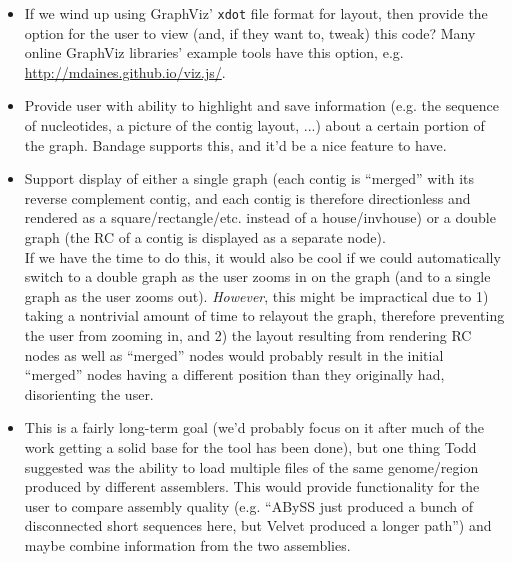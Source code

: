 \documentclass[12pt]{article}
\begin{document}
\begin{itemize}
	\begin{itemize}
	\item If we wind up using GraphViz' \texttt{xdot} file format for
		layout, then provide the option for the user to view (and,
		if they want to, tweak) this code? Many online GraphViz
		libraries' example tools have this option, e.g.
		\url{http://mdaines.github.io/viz.js/}.
	\end{itemize}
	\begin{itemize}
	\item Provide user with ability to highlight and save information
		(e.g. the sequence of nucleotides, a picture of the
		contig layout, ...) about a certain portion of the graph.
		Bandage supports this, and it'd be a nice feature to have.
	\end{itemize}
	\begin{itemize}
	\item Support display of either a single graph (each contig is
		``merged'' with its reverse complement contig, and each
		contig is therefore directionless and rendered as a
		square/rectangle/etc. instead of a house/invhouse) or a
		double graph (the RC of a contig is displayed as a separate
		node). \\
		If we have the time to do this, it would also be cool if
		we could automatically switch to a double graph as the user
		zooms in on the graph (and to a single graph as the
		user zooms out). \emph{However}, this might be impractical
		due to 1) taking a nontrivial amount of time to relayout
		the graph, therefore preventing the user from zooming in,
		and 2) the layout resulting from rendering RC nodes as
		well as ``merged'' nodes would probably result in the
		initial ``merged'' nodes
		having a different position than they originally had,
		disorienting the user.
	\end{itemize}
	\begin{itemize}
	\item This is a fairly long-term goal (we'd probably focus on it
		after much of the work getting a solid base for the tool
		has been done), but one thing Todd suggested was the
		ability to load multiple files of the same genome/region
		produced by different assemblers. This would provide
		functionality for the user to compare assembly quality
		(e.g. ``ABySS just produced a bunch of disconnected
		short sequences here, but Velvet produced a longer path'')
		and maybe combine information from the two assemblies.
	\end{itemize}
\end{itemize}
\end{document}
